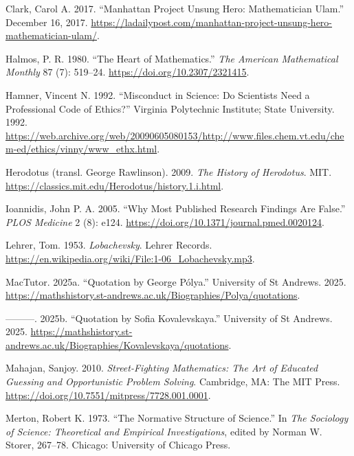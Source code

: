 \documentclass[
  a4paper,
  DIV=11,
  numbers=noendperiod,
  oneside]{scrreprt}
\newlength{\cslhangindent}
\newenvironment{CSLReferences}[2] %
 {\begin{list}{}{%
  \setlength{\itemindent}{0pt}
  \setlength{\leftmargin}{0pt}
  \setlength{\parsep}{0pt}
  \ifodd #1
   \setlength{\leftmargin}{\cslhangindent}
   \setlength{\itemindent}{-1\cslhangindent}
  \fi
  \setlength{\itemsep}{#2\baselineskip}}}
 {\end{list}}
\begin{document}
\label{refs}
\begin{CSLReferences}{1}{0}
Clark, Carol A. 2017. {``Manhattan Project Unsung Hero: Mathematician
Ulam.''} December 16, 2017.
\url{https://ladailypost.com/manhattan-project-unsung-hero-mathematician-ulam/}.

Halmos, P. R. 1980. {``The Heart of Mathematics.''} \emph{The American
Mathematical Monthly} 87 (7): 519--24.
\url{https://doi.org/10.2307/2321415}.

Hamner, Vincent N. 1992. {``Misconduct in Science: Do Scientists Need a
Professional Code of Ethics?''} Virginia Polytechnic Institute; State
University. 1992.
\url{https://web.archive.org/web/20090605080153/http://www.files.chem.vt.edu/chem-ed/ethics/vinny/www_ethx.html}.

Herodotus (transl. George Rawlinson). 2009. \emph{The History of
Herodotus}. MIT.
\url{https://classics.mit.edu/Herodotus/history.1.i.html}.

Ioannidis, John P. A. 2005. {``Why Most Published Research Findings Are
False.''} \emph{PLOS Medicine} 2 (8): e124.
\url{https://doi.org/10.1371/journal.pmed.0020124}.

Lehrer, Tom. 1953. \emph{Lobachevsky}. Lehrer Records.
\url{https://en.wikipedia.org/wiki/File:1-06_Lobachevsky.mp3}.

MacTutor. 2025a. {``Quotation by George {P}{ó}lya.''} University of St
Andrews. 2025.
\url{https://mathshistory.st-andrews.ac.uk/Biographies/Polya/quotations}.

---------. 2025b. {``Quotation by Sofia Kovalevskaya.''} University of
St Andrews. 2025.
\url{https://mathshistory.st-andrews.ac.uk/Biographies/Kovalevskaya/quotations}.

Mahajan, Sanjoy. 2010. \emph{Street-Fighting Mathematics: The Art of
Educated Guessing and Opportunistic Problem Solving}. Cambridge, MA: The
MIT Press. \url{https://doi.org/10.7551/mitpress/7728.001.0001}.

Merton, Robert K. 1973. {``The Normative Structure of Science.''} In
\emph{The Sociology of Science: Theoretical and Empirical
Investigations}, edited by Norman W. Storer, 267--78. Chicago:
University of Chicago Press.


\end{CSLReferences}
\end{document}
